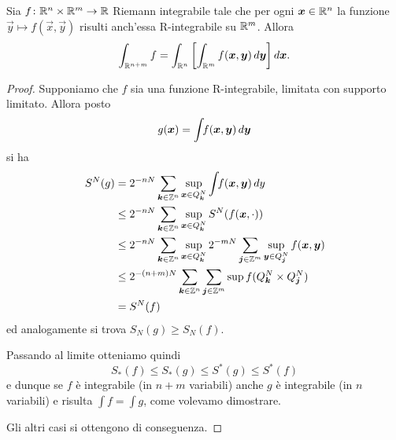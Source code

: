 \begin{theorem}
Sia $f\colon \RR^n\times \RR^m \to \RR$ Riemann integrabile
tale che per ogni $\vec x\in \RR^n$ la funzione $\vec y \mapsto f(\vec x,\vec y)$ 
risulti anch'essa R-integrabile su $\RR^m$.
Allora 
\[
  \int_{\RR^{n+m}} f = \int_{\RR^n} \Enclose{\int_{\RR^m} f(\vec x, \vec y)\, d\vec y}\, d\vec x.
\]
\end{theorem}

\begin{proof}
Supponiamo che $f$ sia una funzione R-integrabile, 
limitata con supporto limitato.
Allora posto 
\[
    g(\vec x) = \int\!\! f(\vec x, \vec y)\, d\vec y\\
\]
si ha
\begin{align*}
    S^N(g)
    &= 2^{-nN} \sum_{\vec k\in \ZZ^n} 
        \sup_{\vec x\in Q^N_{\vec k}}
            \int\!\! f(\vec x,\vec y)\, dy\\
    &\le 2^{-nN} \sum_{\vec k\in \ZZ^n} 
        \sup_{\vec x\in Q^N_{\vec k}}
                S^N(f(\vec x,\cdot))\\
    &\le 2^{-nN} \sum_{\vec k\in \ZZ^n} 
        \sup_{\vec x\in Q^N_{\vec k}}
            2^{-mN} \sum_{\vec j \in \ZZ^m} 
                \sup_{\vec y \in Q^N_{\vec j}} 
                    f(\vec x, \vec y) \\
    &\le 2^{-(n+m)N} \sum_{\vec k\in \ZZ^n} 
        \sum_{\vec j \in \ZZ^m} 
        \sup f(Q^N_{\vec k}\times Q^N_{\vec j})\\
    &= S^N(f)
\end{align*}
ed analogamente si trova $S_N(g) \ge S_N(f)$.

Passando al limite otteniamo quindi 
\[
   S_*(f) \le S_*(g) \le S^*(g) \le S^*(f)
\]
e dunque se $f$ è integrabile (in $n+m$ variabili) anche $g$ è integrabile
(in $n$ variabili) 
e risulta $\int f = \int g$, come volevamo dimostrare.

Gli altri casi si ottengono di conseguenza.
\end{proof}

